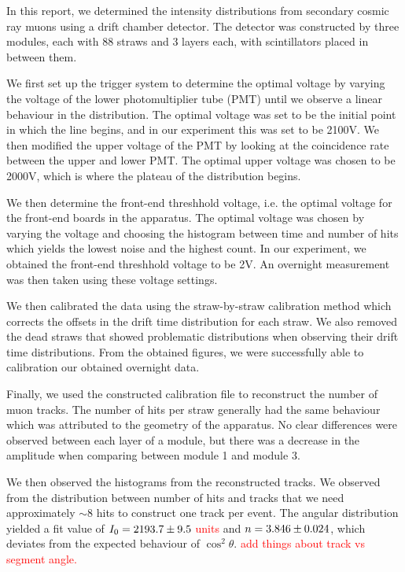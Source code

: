 \documentclass[a4paper]{report}
\numberwithin{equation}{section}
\begin{document}
In this report, we determined the intensity distributions from secondary cosmic ray muons using a drift chamber detector. 
The detector was constructed by three modules, each with 88 straws and 3 layers each, with scintillators placed in between them. \par 

We first set up the trigger system to determine the optimal voltage by varying the voltage of the lower photomultiplier tube (PMT) 
until we observe a linear behaviour in the distribution. The optimal voltage was set to be the initial point in which the line begins, and
in our experiment this was set to be 2100V. We then modified the upper voltage of the PMT by looking at the coincidence rate between the 
upper and lower PMT. The optimal upper voltage was chosen to be 2000V, which is where the plateau of the distribution begins. \par 

We then determine the front-end threshhold voltage, i.e. the optimal voltage for the front-end boards in the apparatus. 
The optimal voltage was chosen by varying the voltage and choosing the histogram between time and number of hits 
which yields the lowest noise and the highest count. In our experiment, we obtained the front-end threshhold voltage to be 
2V. An overnight measurement was then taken using these voltage settings.\par 

We then calibrated the data using the straw-by-straw calibration method which corrects the offsets in the drift time distribution
for each straw. We also removed the dead straws that showed problematic distributions when observing their drift time distributions. 
From the obtained figures, we were successfully able to calibration our obtained overnight data. \par 

Finally, we used the constructed calibration file to reconstruct the number of muon tracks. The number of hits per straw generally 
had the same behaviour which was attributed to the geometry of the apparatus. No clear differences were observed between each layer 
of a module, but there was a decrease in the amplitude when comparing between module 1 and module 3. \par 

We then observed the histograms from the reconstructed tracks. We observed from the distribution between number of hits and tracks 
that we need approximately $\sim 8$ hits to construct one track per event. The angular distribution yielded a fit value of 
$I_0 = \num{2193.7 \pm 9.5}$ \textcolor{red}{units} and $n = \num{3.846 \pm 0.024}$, which deviates from the expected behaviour of 
$\cos^2 \theta$. \textcolor{red}{add things about track vs segment angle.}
\end{document}
